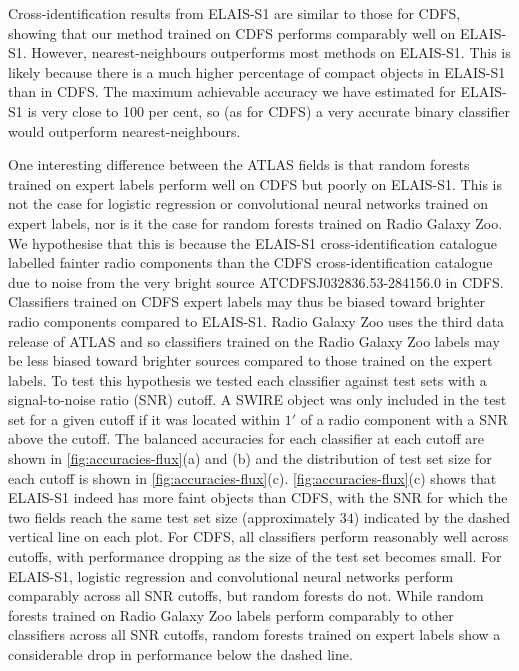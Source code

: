 \documentclass[fleqn,usenatbib,usedcolumn]{mnras}
\begin{document}
  Cross-identification results from ELAIS-S1 are similar to those for CDFS, showing that our method trained on CDFS performs comparably well on ELAIS-S1. However, nearest-neighbours outperforms most methods on ELAIS-S1. This is likely because there is a much higher percentage of compact objects in ELAIS-S1 than in CDFS. The maximum achievable accuracy we have estimated for ELAIS-S1 is very close to 100 per cent, so (as for CDFS) a very accurate binary classifier would outperform nearest-neighbours.

  One interesting difference between the ATLAS fields is that random forests trained on expert labels perform well on CDFS but poorly on ELAIS-S1. This is not the case for logistic regression or convolutional neural networks trained on expert labels, nor is it the case for random forests trained on Radio Galaxy Zoo. We hypothesise that this is because the ELAIS-S1 cross-identification catalogue \citep{middelberg08} labelled fainter radio components than the CDFS cross-identification catalogue \citep{norris06} due to noise from the very bright source ATCDFS\textunderscore{}J032836.53-284156.0 in CDFS. Classifiers trained on CDFS expert labels may thus be biased toward brighter radio components compared to ELAIS-S1. Radio Galaxy Zoo uses the third data release of ATLAS \citep{franzen15} and so classifiers trained on the Radio Galaxy Zoo labels may be less biased toward brighter sources compared to those trained on the expert labels. To test this hypothesis we tested each classifier against test sets with a signal-to-noise ratio (SNR) cutoff. A SWIRE object was only included in the test set for a given cutoff if it was located within $1'$ of a radio component with a SNR above the cutoff. The balanced accuracies for each classifier at each cutoff are shown in \autoref{fig:accuracies-flux}(a) and (b) and the distribution of test set size for each cutoff is shown in \autoref{fig:accuracies-flux}(c). \autoref{fig:accuracies-flux}(c) shows that ELAIS-S1 indeed has more faint objects than CDFS, with the SNR for which the two fields reach the same test set size (approximately $34$) indicated by the dashed vertical line on each plot. For CDFS, all classifiers perform reasonably well across cutoffs, with performance dropping as the size of the test set becomes small. For ELAIS-S1, logistic regression and convolutional neural networks perform comparably across all SNR cutoffs, but random forests do not. While random forests trained on Radio Galaxy Zoo labels perform comparably to other classifiers across all SNR cutoffs, random forests trained on expert labels show a considerable drop in performance below the dashed line.
\end{document}
